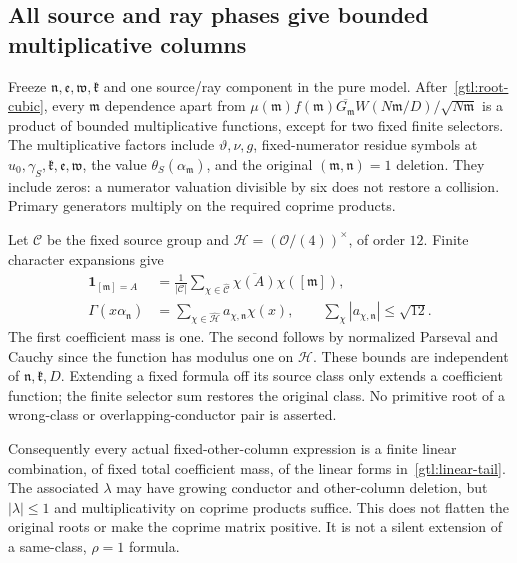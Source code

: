 \subsection{All source and ray phases give bounded multiplicative columns}
\label{gtl:phase-proof}
Freeze $\mathfrak n,\mathfrak e,\mathfrak w,\mathfrak k$
and one source/ray component in the pure model.
After~\eqref{gtl:root-cubic}, every $\mathfrak m$ dependence
apart from
$\mu(\mathfrak m)f(\mathfrak m)
 \overline{G_{\mathfrak m}}W(N\mathfrak m/D)/\sqrt{N\mathfrak m}$
is a product of bounded multiplicative functions, except
for two fixed finite selectors.
The multiplicative factors include $\vartheta,\nu,g$,
fixed-numerator residue symbols at $u_0,\gamma_S,\mathfrak k,
\mathfrak e,\mathfrak w$, the value
$\theta_S(\alpha_{\mathfrak m})$, and the original
$(\mathfrak m,\mathfrak n)=1$ deletion.
They include zeros: a numerator valuation divisible by six
does not restore a collision.
Primary generators multiply on the required coprime products.

Let $\mathcal C$ be the fixed source group and
$\mathcal H=(\mathcal O/(4))^\times$, of order $12$.
Finite character expansions give
\begin{equation}\label{gtl:finite-selectors}
 \begin{aligned}
 \mathbf1_{[\mathfrak m]=A}
   &=\frac1{|\mathcal C|}\sum_{\chi\in\widehat{\mathcal C}}
           \overline{\chi(A)}\chi([\mathfrak m]),\\
 \Gamma(x\alpha_{\mathfrak n})
   &=\sum_{\chi\in\widehat{\mathcal H}}a_{\chi,\mathfrak n}\chi(x),
       \qquad \sum_\chi|a_{\chi,\mathfrak n}|\le\sqrt{12}.
 \end{aligned}
\end{equation}
The first coefficient mass is one. The second follows by
normalized Parseval and Cauchy since the function has
modulus one on $\mathcal H$.
These bounds are independent of $\mathfrak n,\mathfrak k,D$.
Extending a fixed formula off its source class only extends
a coefficient function; the finite selector sum restores
the original class. No primitive root of a wrong-class
or overlapping-conductor pair is asserted.

Consequently every actual fixed-other-column expression is
a finite linear combination, of fixed total coefficient
mass, of the linear forms in~\eqref{gtl:linear-tail}.
The associated $\lambda$ may have growing conductor and
other-column deletion, but $|\lambda|\le1$ and
multiplicativity on coprime products suffice.
This does not flatten the original roots or make the
coprime matrix positive. It is not a silent extension of
a same-class, $\rho=1$ formula.

